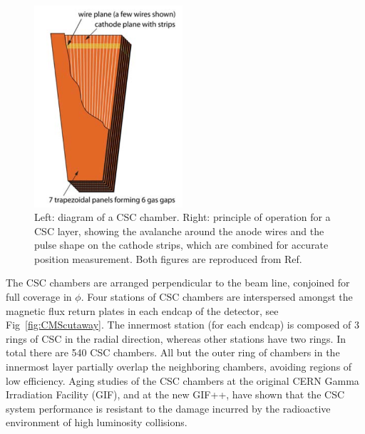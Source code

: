 \begin{figure}[htbp]
  \centering
   \includegraphics[width=0.49\textwidth]{figures/LHCandCMS/CSCdiagram.png}
  \caption{
    Left: diagram of a CSC chamber. Right: principle of operation for a CSC
    layer, showing the avalanche around the anode wires and the pulse shape
    on the cathode strips, which are combined for accurate position measurement.
    Both figures are reproduced from Ref.~\cite{Chatrchyan:2008aa}
        }
 \label{fig:CSC}
\end{figure}

The CSC chambers are arranged perpendicular to the beam line,
conjoined for full coverage in $\phi$. Four stations of CSC chambers are interspersed
amongst the magnetic flux return plates in each endcap of the detector, see
Fig~\ref{fig:CMScutaway}. The innermost station (for each endcap) is composed of 
3 rings of CSC in the radial direction, whereas other stations have two rings.
In total there are 540 CSC chambers. All but the outer ring of chambers in the 
innermost layer partially overlap the neighboring chambers, avoiding regions
of low efficiency. Aging studies of the CSC chambers at the original CERN Gamma
Irradiation Facility (GIF), and at the new GIF++, have shown that the CSC system
performance is resistant to the damage incurred by the radioactive environment
of high luminosity collisions. 

